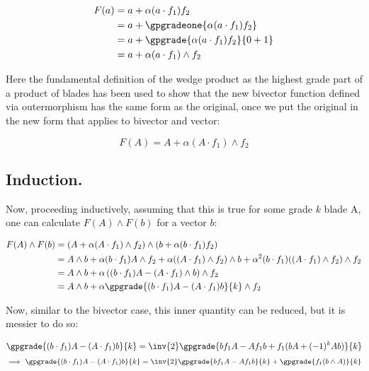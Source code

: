 \begin{align*}
F(a) 
&= a + \alpha(a \cdot f_1) f_2 \\
&= a + \gpgradeone{\alpha(a \cdot f_1) f_2} \\
&= a + \gpgrade{\alpha(a \cdot f_1) f_2}{0+1} \\
&= a + \alpha(a \cdot f_1) \wedge f_2 \\
\end{align*}

Here the fundamental definition of the wedge product as the 
highest grade part of a product of blades has been used to show that the new
bivector function defined via outermorphism has the same form as the original, once we put the original in the new form that applies to bivector and vector:

\begin{equation}
F(A) = A + \alpha(A \cdot f_1) \wedge f_2 
\end{equation}

\subsection{Induction. }

Now, proceeding inductively, assuming that this is true for some grade $k$ blade A, one can calculate $F(A) \wedge F(b)$ for a vector $b$:

\begin{align*}
F(A) \wedge F(b)
&= (A + \alpha(A \cdot f_1) \wedge f_2) \wedge (b + \alpha(b \cdot f_1) f_2 ) \\
&= A \wedge b 
+ \alpha( b \cdot f_1 ) A \wedge f_2 
+ \alpha (( A \cdot f_1) \wedge f_2) \wedge b
+ \alpha^2 (b \cdot f_1) ((A \cdot f_1) \wedge f_2) \wedge f_2 \\
&= A \wedge b + \alpha \left( ( b \cdot f_1 ) A - ( A \cdot f_1) \wedge b \right) \wedge f_2 \\
&= A \wedge b + \alpha \gpgrade{ ( b \cdot f_1 ) A - ( A \cdot f_1) b}{k} \wedge f_2 \\
\end{align*}

Now, similar to the bivector case, this inner quantity can be reduced, but it is messier to do so:

\begin{align*}
\gpgrade{ ( b \cdot f_1 ) A - ( A \cdot f_1) b}{k}
&= \inv{2} \gpgrade{ b f_1 A - A f_1 b + f_1 (b A + (-1)^{k} A b) }{k} \\
\end{align*}
\begin{equation} \label{eqn:outermorphism_det:r1}
\implies
\gpgrade{ ( b \cdot f_1 ) A - ( A \cdot f_1) b}{k} = \inv{2} \gpgrade{ b f_1 A - A f_1 b}{k} + \gpgrade{ f_1 (b \wedge A) }{k}
\end{equation}

